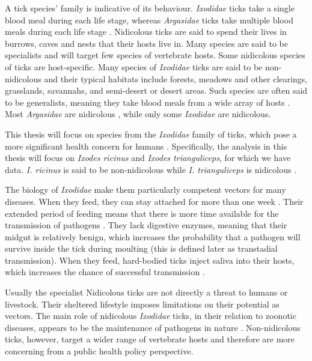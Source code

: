 \documentclass[hidelinks]{article}
\begin{document}
A tick species' family is indicative of its behaviour. \textit{Ixodidae} ticks take a single blood meal during each life stage, whereas \textit{Argasidae} ticks take multiple blood meals during each life stage \citep{Johnson2023d}. Nidicolous ticks are said to spend their lives in burrows, caves and nests that their hosts live in. Many species are said to be specialists and will target few species of vertebrate hosts. Some nidicolous species of ticks are host-specific. Many species of \textit{Ixodidae} ticks are said to be non-nidicolous and their typical habitats include forests, meadows and other clearings, grasslands, savannahs, and semi-desert or desert areas. Such species are often said to be generalists, meaning they take blood meals from a wide array of hosts \citep{Nicholson2019}. Most \textit{Argasidae} are nidicolous \citep{Vial2009}, while only some \textit{Ixodidae} are nidicolous. 

This thesis will focus on species from the \textit{Ixodidae} family of ticks, which pose a more significant health concern for humans \citep{Parola2001}. Specifically, the analysis in this thesis will focus on \textit{Ixodes ricinus} and \textit{Ixodes trianguliceps}, for which we have data. \textit{I. ricinus} is said to be non-nidicolous while \textit{I. trianguliceps} is nidicolous \citep{Nicholson2019}.

The biology of \textit{Ixodidae} make them particularly competent vectors for many diseases. When they feed, they can stay attached for more than one week \citep{Johnson2023b}. Their extended period of feeding means that there is more time available for the transmission of pathogens \citep{Gray2024}. They lack digestive enzymes, meaning that their midgut is relatively benign, which increases the probability that a pathogen will survive inside the tick during moulting (this is defined later as transtadial transmission). When they feed, hard-bodied ticks inject saliva into their hosts, which increases the chance of successful transmission \citep{Gray2024}.

Usually the specialist Nidicolous ticks are not directly a threat to humans or livestock. Their sheltered lifestyle imposes limitations on their potential as vectors. The main role of nidicolous \textit{Ixodidae} ticks, in their relation to zoonotic diseases, appears to be the maintenance of pathogens in nature \citep{gray2014}. Non-nidicolous ticks, however, target a wider range of vertebrate hosts and therefore are more concerning from a public health policy perspective.
\end{document}

